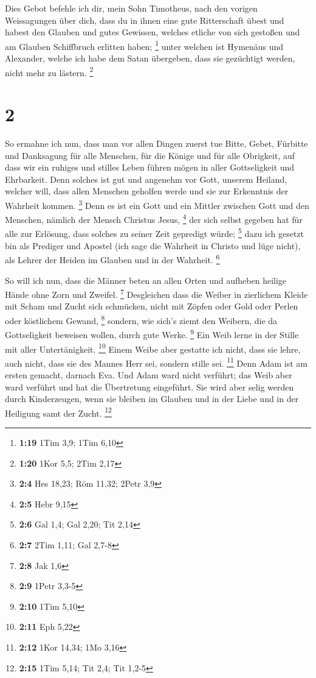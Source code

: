  Dies Gebot befehle ich dir, mein Sohn Timotheus, nach
den vorigen Weissagungen über dich, dass du in ihnen eine gute
Ritterschaft übest  und habest den Glauben und gutes
Gewissen, welches etliche von sich gestoßen und am Glauben Schiffbruch
erlitten haben; \footnote{\textbf{1:19} 1Tim 3,9; 1Tim 6,10}
 unter welchen ist Hymenäus und Alexander, welche ich
habe dem Satan übergeben, dass sie gezüchtigt werden, nicht mehr zu
lästern. \footnote{\textbf{1:20} 1Kor 5,5; 2Tim 2,17}

\hypertarget{section-1}{%
\section{2}\label{section-1}}

 So ermahne ich nun, dass man vor allen Dingen zuerst tue
Bitte, Gebet, Fürbitte und Danksagung für alle Menschen, 
für die Könige und für alle Obrigkeit, auf dass wir ein ruhiges und
stilles Leben führen mögen in aller Gottseligkeit und Ehrbarkeit.
 Denn solches ist gut und angenehm vor Gott, unserem
Heiland,  welcher will, dass allen Menschen geholfen werde
und sie zur Erkenntnis der Wahrheit kommen. \footnote{\textbf{2:4} Hes
  18,23; Röm 11,32; 2Petr 3,9}  Denn es ist ein Gott und
ein Mittler zwischen Gott und den Menschen, nämlich der Mensch Christus
Jesus, \footnote{\textbf{2:5} Hebr 9,15}  der sich selbst
gegeben hat für alle zur Erlösung, dass solches zu seiner Zeit gepredigt
würde; \footnote{\textbf{2:6} Gal 1,4; Gal 2,20; Tit 2,14}
 dazu ich gesetzt bin als Prediger und Apostel (ich sage
die Wahrheit in Christo und lüge nicht), als Lehrer der Heiden im
Glauben und in der Wahrheit. \footnote{\textbf{2:7} 2Tim 1,11; Gal 2,7-8}

 So will ich nun, dass die Männer beten an allen Orten und
aufheben heilige Hände ohne Zorn und Zweifel. \footnote{\textbf{2:8} Jak
  1,6}  Desgleichen dass die Weiber in zierlichem Kleide
mit Scham und Zucht sich schmücken, nicht mit Zöpfen oder Gold oder
Perlen oder köstlichem Gewand, \footnote{\textbf{2:9} 1Petr 3,3-5}
 sondern, wie sich's ziemt den Weibern, die da
Gottseligkeit beweisen wollen, durch gute Werke. \footnote{\textbf{2:10}
  1Tim 5,10}  Ein Weib lerne in der Stille mit aller
Untertänigkeit. \footnote{\textbf{2:11} Eph 5,22}  Einem
Weibe aber gestatte ich nicht, dass sie lehre, auch nicht, dass sie des
Mannes Herr sei, sondern stille sei. \footnote{\textbf{2:12} 1Kor 14,34;
  1Mo 3,16}  Denn Adam ist am ersten gemacht, darnach
Eva.  Und Adam ward nicht verführt; das Weib aber ward
verführt und hat die Übertretung eingeführt.  Sie wird
aber selig werden durch Kinderzeugen, wenn sie bleiben im Glauben und in
der Liebe und in der Heiligung samt der Zucht. \footnote{\textbf{2:15}
  1Tim 5,14; Tit 2,4; Tit 1,2-5}

